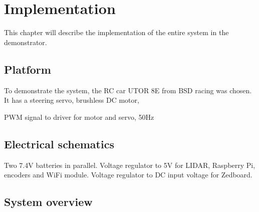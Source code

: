 \chapter{Implementation}
This chapter will describe the implementation of the entire system in the demonstrator.

\section{Platform}
To demonstrate the system, the RC car UTOR 8E from BSD racing was chosen. It has a steering servo, brushless DC motor, 

PWM signal to driver for motor and servo, 50Hz

\section{Electrical schematics}
Two 7.4V batteries in parallel. Voltage regulator to 5V for LIDAR, Raspberry Pi, encoders and WiFi module. Voltage regulator to DC input voltage for Zedboard.

\section{System overview}









